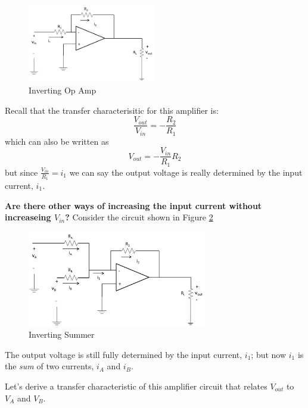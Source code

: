 \documentclass{handout}
\begin{document}
\begin{figure} [h! t! b!]
\centering
\includegraphics[width=0.5\textwidth]{InvertingOpAmp.jpg}
\caption{Inverting Op Amp}
\label{fig: InvertingOpAmp}
\end{figure}

Recall that the transfer characterisitic for this amplifier is:
\begin{equation}
\frac{V_{out}}{V_{in}}=-\frac{R_2}{R_1}
\end{equation}
which can also be written as
\begin{equation}
V_{out}=-\frac{V_{in}}{R_1}R_2
\end{equation}
but since $\frac{V_{in}}{R_1} = i_1$ we can say the output voltage is really determined by the input current, $i_1$.

\textbf{Are there other ways of increasing the input current without increaseing $V_{in}$?}
Consider the circuit shown in Figure \ref{fig: InvertingSummer}
\begin{figure} [h!]
\centering
\includegraphics[width=0.7\textwidth]{InvertingSummer.jpg}
\caption{Inverting Summer}
\label{fig: InvertingSummer}
\end{figure}

The output voltage is still fully determined by the input current, $i_1$; but now $i_1$ is the {\em sum} of two currents, $i_A$ and $i_B$.  

Let's derive a transfer characteristic of this amplifier circuit that relates $V_{out}$ to $V_A$ and $V_B$.
\end{document}
